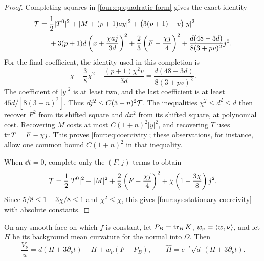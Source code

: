 \begin{proof}
Completing squares in \eqref{four:eq:quadratic-form} gives the exact identity
\begin{equation}\label{four:sys:exact-squares}
\begin{aligned}
 \mathcal T={}&\frac12|T^0|^2+|M+(p+1)ay|^2
        +\bigl(3(p+1)-v\bigr)|y|^2\\
 &+3(p+1)d\left(x+\frac{\chi a j}{3d}\right)^2
       +\frac23\left(F-\frac{\chi j}{4}\right)^2
       +\frac{d(48-3d)}{8(3+pv)^2}j^2.
\end{aligned}
\end{equation}
For the final coefficient, the identity used in this completion is
\[
 \chi-\frac38\chi^2-\frac{(p+1)\chi^2v}{3d}
                 =\frac{d(48-3d)}{8(3+pv)^2}.
\]
The coefficient of $|y|^2$ is at least two, and the last coefficient is
at least $45d/[8(3+n)^2]$.  Thus $d j^2\le C(3+n)^2\mathcal T$.
The inequalities $\chi^2\le d^2\le d$ then recover $F^2$ from its
shifted square and $d x^2$ from its shifted square, at polynomial cost.
Recovering $M$ costs at most $C(1+n)^2|y|^2$, and recovering $T$ uses
$\operatorname{tr} T=F-\chi j$.  This proves \eqref{four:eq:coercivity}; these observations,
for instance, allow one common bound $C(1+n)^2$ in that inequality.

When $\dd t=0$, complete only the $(F,j)$ terms to obtain
\begin{equation}\label{four:sys:stationary-squares}
 \mathcal T=\frac12|T^0|^2+|M|^2
      +\frac23\left(F-\frac{\chi j}{4}\right)^2
      +\chi\left(1-\frac{3\chi}{8}\right)j^2.
\end{equation}
Since $5/8\le1-3\chi/8\le1$ and $\chi^2\le\chi$, this gives
\eqref{four:sys:stationary-coercivity} with absolute constants.
\end{proof}

\begin{lemma}\label{four:sys:boundary-lemma}
On any smooth face on which $f$ is constant, let
$P_B=\operatorname{tr}_BK$, $w_\nu=\langle w,\nu\rangle$, and let $H$ be its background
mean curvature for the normal into $\Omega$.  Then
\begin{equation}\label{four:eq:boundary-identity}
 \frac{V_\nu}{u}
   =d(H+3\partial_\nu t)-H+w_\nu(F-P_B),\qquad
 \widehat H=e^{-t}\sqrt d\,(H+3\partial_\nu t).
\end{equation}
\end{lemma}

